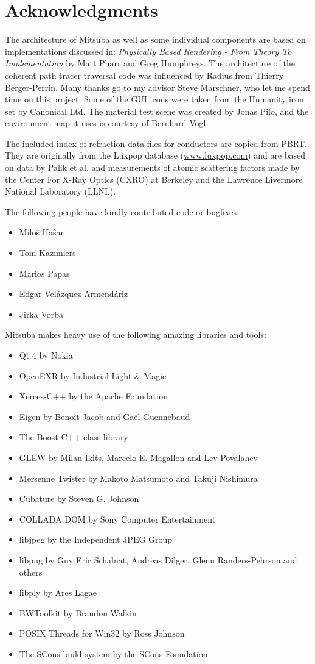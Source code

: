 \section{Acknowledgments}
The architecture of Mitsuba as well as some individual components are based on implementations discussed in: \emph{Physically Based Rendering - From Theory To Implementation} by Matt Pharr and Greg Humphreys.
The architecture of the coherent path tracer traversal code was influenced by Radius from Thierry Berger-Perrin.
Many thanks go to my advisor Steve Marschner, who let me spend time on this project.
Some of the GUI icons were taken from the Humanity icon set by Canonical Ltd.
The material test scene was created by Jonas Pilo, and the environment map
it uses is courtesy of Bernhard Vogl.

The included index of refraction data files for conductors are copied from
PBRT. They are originally from the Luxpop database (\url{www.luxpop.com}) 
and are based on data by Palik et al. \cite{Palik1998Handbook}
and measurements of atomic scattering factors made by the Center For
X-Ray Optics (CXRO) at Berkeley and the Lawrence Livermore National 
Laboratory (LLNL).

The following people have kindly contributed code or bugfixes:
\begin{itemize}
\item Milo\^{s} Ha\^{s}an
\item Tom Kazimiers
\item Marios Papas
\item Edgar Vel\'{a}zquez-Armend\'{a}riz
\item Jirka Vorba
\end{itemize}

Mitsuba makes heavy use of the following amazing libraries and tools: 
\begin{itemize}
\item Qt 4 by Nokia
\item OpenEXR by Industrial Light \& Magic
\item Xerces-C+\!+ by the Apache Foundation
\item Eigen by Beno\^it Jacob and Ga\"el Guennebaud
\item The Boost C+\!+ class library
\item GLEW by Milan Ikits, Marcelo E. Magallon and Lev Povalahev
\item Mersenne Twister by Makoto Matsumoto and Takuji Nishimura
\item Cubature by Steven G. Johnson
\item COLLADA DOM by Sony Computer Entertainment
\item libjpeg by the Independent JPEG Group
\item libpng by Guy Eric Schalnat, Andreas Dilger, Glenn Randers-Pehrson and \mbox{others}
\item libply by Ares Lagae
\item BWToolkit by Brandon Walkin
\item POSIX Threads for Win32 by Ross Johnson
\item The SCons build system by the SCons Foundation
\end{itemize}
